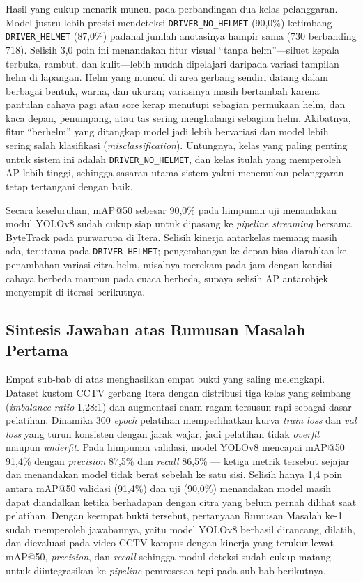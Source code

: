 Hasil yang cukup menarik muncul pada perbandingan dua kelas pelanggaran. Model justru lebih presisi mendeteksi \texttt{DRIVER\_NO\_HELMET} (90,0\%) ketimbang \texttt{DRIVER\_HELMET} (87,0\%) padahal jumlah anotasinya hampir sama (730 berbanding 718). Selisih 3,0 poin ini menandakan fitur visual ``tanpa helm''---siluet kepala terbuka, rambut, dan kulit---lebih mudah dipelajari daripada variasi tampilan helm di lapangan. Helm yang muncul di area gerbang sendiri datang dalam berbagai bentuk, warna, dan ukuran; variasinya masih bertambah karena pantulan cahaya pagi atau sore kerap menutupi sebagian permukaan helm, dan kaca depan, penumpang, atau tas sering menghalangi sebagian helm. Akibatnya, fitur ``berhelm'' yang ditangkap model jadi lebih bervariasi dan model lebih sering salah klasifikasi (\textit{misclassification}). Untungnya, kelas yang paling penting untuk sistem ini adalah \texttt{DRIVER\_NO\_HELMET}, dan kelas itulah yang memperoleh AP lebih tinggi, sehingga sasaran utama sistem yakni menemukan pelanggaran tetap tertangani dengan baik.

Secara keseluruhan, mAP@50 sebesar 90,0\% pada himpunan uji menandakan modul YOLOv8 sudah cukup siap untuk dipasang ke \textit{pipeline} \textit{streaming} bersama ByteTrack pada purwarupa di Itera. Selisih kinerja antarkelas memang masih ada, terutama pada \texttt{DRIVER\_HELMET}; pengembangan ke depan bisa diarahkan ke penambahan variasi citra helm, misalnya merekam pada jam dengan kondisi cahaya berbeda maupun pada cuaca berbeda, supaya selisih AP antarobjek menyempit di iterasi berikutnya.

\subsection{Sintesis Jawaban atas Rumusan Masalah Pertama}
\label{subsec:sintesis-rm1}

Empat sub-bab di atas menghasilkan empat bukti yang saling melengkapi. Dataset kustom CCTV gerbang Itera dengan distribusi tiga kelas yang seimbang (\textit{imbalance ratio} 1,28:1) dan augmentasi enam ragam tersusun rapi sebagai dasar pelatihan. Dinamika 300 \textit{epoch} pelatihan memperlihatkan kurva \textit{train loss} dan \textit{val loss} yang turun konsisten dengan jarak wajar, jadi pelatihan tidak \textit{overfit} maupun \textit{underfit}. Pada himpunan validasi, model YOLOv8 mencapai mAP@50 91,4\% dengan \textit{precision} 87,5\% dan \textit{recall} 86,5\% --- ketiga metrik tersebut sejajar dan menandakan model tidak berat sebelah ke satu sisi. Selisih hanya 1,4 poin antara mAP@50 validasi (91,4\%) dan uji (90,0\%) menandakan model masih dapat diandalkan ketika berhadapan dengan citra yang belum pernah dilihat saat pelatihan. Dengan keempat bukti tersebut, pertanyaan Rumusan Masalah ke-1 sudah memperoleh jawabannya, yaitu model YOLOv8 berhasil dirancang, dilatih, dan dievaluasi pada video CCTV kampus dengan kinerja yang terukur lewat mAP@50, \textit{precision}, dan \textit{recall} sehingga modul deteksi sudah cukup matang untuk diintegrasikan ke \textit{pipeline} pemrosesan tepi pada sub-bab berikutnya.

